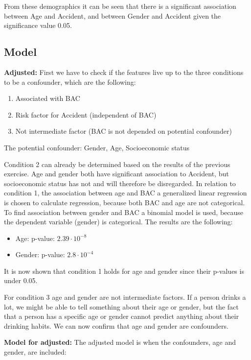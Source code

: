 From these demographics it can be seen that there is a significant association between Age and Accident, and between Gender and Accident given the significance value 0.05.

\subsection{Model}
\textbf{Adjusted:}
First we have to check if the features live up to the three conditions to be a confounder, which are the following: 
\begin{enumerate}
    \item Associated with BAC
    \item Risk factor for Accident (independent of BAC)
    \item Not intermediate factor (BAC is not depended on potential confounder)
\end{enumerate}
The potential confounder: Gender, Age, Socioeconomic status

Condition 2 can already be determined based on the results of the previous exercise. Age and gender both have significant association to Accident, but socioeconomic status has not and will therefore be disregarded.
In relation to condition 1, the association between age and BAC a generalized linear regression is chosen to calculate regression, because both BAC and age are not categorical.
To find association between gender and BAC a binomial model is used, because the dependent variable (gender) is categorical.
The results are the following:

\begin{itemize}
    \item Age: p-value: $2.39 \cdot 10^{-8}$
    \item Gender: p-value: $2.8 \cdot 10^{-4}$
\end{itemize}

It is now shown that condition 1 holds for age and gender since their p-values is under 0.05. 

For condition 3 age and gender are not intermediate factors. If a person drinks a lot, we might be able to tell something about their age or gender, but the fact that a person has a specific age or gender cannot predict anything about their drinking habits. We can now confirm that age and gender are confounders. 

\textbf{Model for adjusted: } 
The adjusted model is when the confounders, age and gender, are included: 

